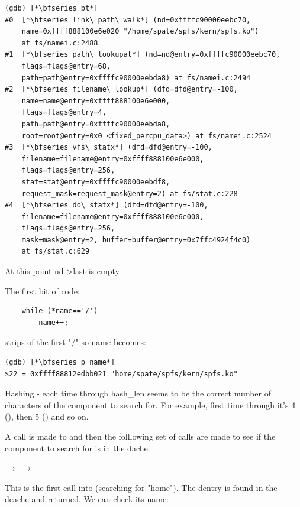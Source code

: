 \begin{lstlisting}
(gdb) [*\bfseries bt*]
#0  [*\bfseries link\_path\_walk*] (nd=0xffffc90000eebc70, 
    name=0xffff888100e6e020 "/home/spate/spfs/kern/spfs.ko") 
    at fs/namei.c:2488
#1  [*\bfseries path\_lookupat*] (nd=nd@entry=0xffffc90000eebc70, 
    flags=flags@entry=68, 
    path=path@entry=0xffffc90000eebda8) at fs/namei.c:2494
#2  [*\bfseries filename\_lookup*] (dfd=dfd@entry=-100, 
    name=name@entry=0xffff888100e6e000, 
    flags=flags@entry=4, 
    path=path@entry=0xffffc90000eebda8, 
    root=root@entry=0x0 <fixed_percpu_data>) at fs/namei.c:2524
#3  [*\bfseries vfs\_statx*] (dfd=dfd@entry=-100, 
    filename=filename@entry=0xffff888100e6e000, 
    flags=flags@entry=256, 
    stat=stat@entry=0xffffc90000eebdf8, 
    request_mask=request_mask@entry=2) at fs/stat.c:228
#4  [*\bfseries do\_statx*] (dfd=dfd@entry=-100, 
    filename=filename@entry=0xffff888100e6e000, 
    flags=flags@entry=256, 
    mask=mask@entry=2, buffer=buffer@entry=0x7ffc4924f4c0) 
    at fs/stat.c:629
\end{lstlisting}

\noindent
At this point nd->last is empty

The first bit of code:

\begin{lstlisting}
    while (*name=='/')
        name++;
\end{lstlisting}

\noindent
strips of the first "/" so name becomes:

\begin{lstlisting}
(gdb) [*\bfseries p name*]
$22 = 0xffff88812edbb021 "home/spate/spfs/kern/spfs.ko"
\end{lstlisting}

\noindent
Hashing - each time through hash\_len seems to be the correct number of characters of the component to search for. For example, first time through it's 4 (), then 5 () and so on.

A call is made to  and then the folllowing set of calls are made to see if the component to search for is in the dache:

\small
\bigskip 
{} $\rightarrow$  $\rightarrow$ 
    
\bigskip
\normalsize
\noindent
This is the first call into  (searching for "home"). The dentry is found in the dcache and returned. We can check its name:

